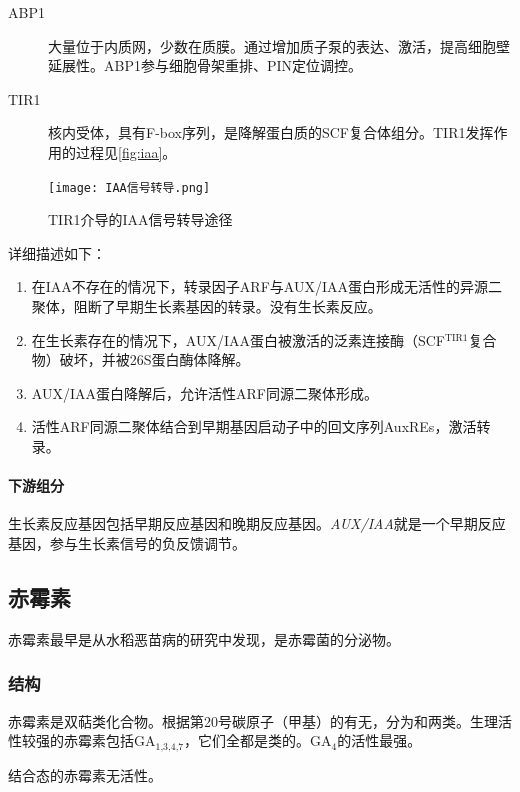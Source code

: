 \begin{description}
	\item[ABP1] 大量位于内质网，少数在质膜。通过增加质子泵的表达、激活，提高细胞壁延展性。ABP1参与细胞骨架重排、PIN定位调控。
	\item[TIR1] 核内受体，具有F-box序列，是降解蛋白质的SCF复合体组分。TIR1发挥作用的过程见\autoref{fig:iaa}。
\end{description}

\begin{figure}[htbp]
	\centering
	\texttt{[image: IAA信号转导.png]}
	\caption{TIR1介导的IAA信号转导途径}
	\label{fig:iaa}
\end{figure}

详细描述如下：

\begin{enumerate}
	\item 在IAA不存在的情况下，转录因子ARF与AUX/IAA蛋白形成无活性的异源二聚体，阻断了早期生长素基因的转录。没有生长素反应。
	\item 在生长素存在的情况下，AUX/IAA蛋白被激活的泛素连接酶（SCF$^{\text{TIR1}}$复合物）破坏，并被26S蛋白酶体降解。
	\item AUX/IAA蛋白降解后，允许活性ARF同源二聚体形成。
	\item 活性ARF同源二聚体结合到早期基因启动子中的回文序列AuxREs，激活转录。
\end{enumerate}

\paragraph{下游组分}

生长素反应基因包括早期反应基因和晚期反应基因。\textit{AUX/IAA}就是一个早期反应基因，参与生长素信号的负反馈调节。

\subsection{赤霉素}

赤霉素最早是从水稻恶苗病的研究中发现，是赤霉菌的分泌物。

\subsubsection{结构}

赤霉素是双萜类化合物。根据第20号碳原子（甲基）的有无，分为和两类。生理活性较强的赤霉素包括GA$_{\text{1,3,4,7}}$，它们全都是类的。GA$_{4}$的活性最强。

结合态的赤霉素无活性。


